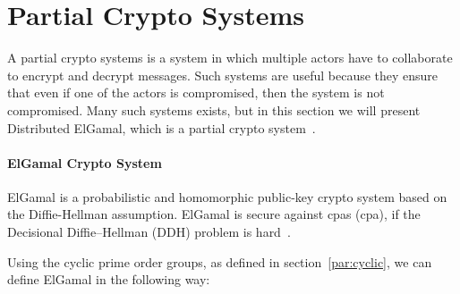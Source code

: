 \begin{comment}
\paragraph{Security Goals}
\begin{itemize}

    \item An adversary should not be able to forge evidence of identity without compromising the secrets of both \gls{authenticator} and \gls{sibling}.
    
    \item Hijacking an active session or token should not give the \gls{adversary} unauthorized access for longer than the session is actively kept alive by the \gls{server} and \gls{authenticator}.
    
\end{itemize}
\end{comment}

\section{Partial Crypto Systems}

A partial crypto systems is a system in which multiple actors have to collaborate to encrypt and decrypt messages. Such systems are useful because they ensure that even if one of the actors is compromised, then the system is not compromised. Many such systems exists, but in this section we will present Distributed ElGamal, which is a partial crypto system~\cite{brandt2005efficient}.


\paragraph{ElGamal Crypto System}

ElGamal is a probabilistic and homomorphic public-key crypto system based on the Diffie-Hellman assumption. ElGamal is secure against \Glspl{cpa} (\acrshort{cpa}), if the Decisional Diffie–Hellman (DDH) problem is hard~\cite[page 400]{katz2014introduction}.

Using the cyclic prime order groups, as defined in section~\ref{par:cyclic}, we can define ElGamal in the following way:

